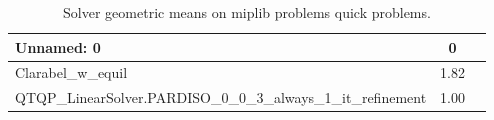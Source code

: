 \begin{table}
\caption{Solver geometric means on miplib problems quick problems.}
\label{t-miplib problems quick-geom_mean}
\begin{tabular}{lcc}
\toprule
Unnamed: 0 & 0 \\
\midrule
Clarabel_w_equil & 1.82 \\
QTQP_LinearSolver.PARDISO_0_0_3_always_1_it_refinement & 1.00 \\
\bottomrule
\end{tabular}
\end{table}
